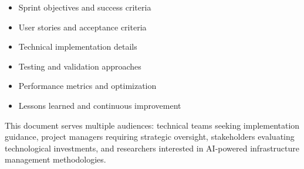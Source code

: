 \begin{itemize}[leftmargin=*]
    \item Sprint objectives and success criteria
    \item User stories and acceptance criteria
    \item Technical implementation details
    \item Testing and validation approaches
    \item Performance metrics and optimization
    \item Lessons learned and continuous improvement
\end{itemize}

This document serves multiple audiences: technical teams seeking implementation guidance, project managers requiring strategic oversight, stakeholders evaluating technological investments, and researchers interested in AI-powered infrastructure management methodologies.